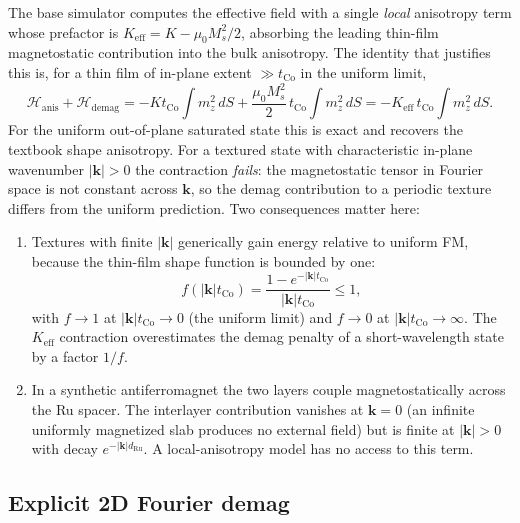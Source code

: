 \documentclass[11pt,a4paper]{article}
\newcommand{\mb}[1]{\mathbf{#1}}
\newcommand{\tCo}{t_{\text{Co}}}
\newcommand{\dRu}{d_{\text{Ru}}}
\newcommand{\Keff}{K_{\text{eff}}}
\newcommand{\Ms}{M_s}
\begin{document}
The base simulator computes the effective field with a single
\emph{local} anisotropy term whose prefactor is
$\Keff = K - \mu_0 \Ms^2 / 2$, absorbing the leading thin-film
magnetostatic contribution into the bulk anisotropy. The
identity that justifies this is, for a thin film of in-plane
extent $\gg \tCo$ in the uniform limit,
%
\begin{equation}\label{eq:keff_uniform}
\mathcal{H}_{\text{anis}} + \mathcal{H}_{\text{demag}}
    = -K \tCo \int m_z^2 \, dS
    + \frac{\mu_0 \Ms^2}{2} \, \tCo \int m_z^2 \, dS
    = -\Keff \, \tCo \int m_z^2 \, dS.
\end{equation}
%
For the uniform out-of-plane saturated state this is exact
and recovers the textbook shape anisotropy. For a textured
state with characteristic in-plane wavenumber $|\mb{k}| > 0$
the contraction \emph{fails}: the magnetostatic tensor in
Fourier space is not constant across $\mb{k}$, so the demag
contribution to a periodic texture differs from the uniform
prediction. Two consequences matter here:
%
\begin{enumerate}[nosep]
\item Textures with finite $|\mb{k}|$ generically gain energy
    relative to uniform FM, because the thin-film shape
    function is bounded by one:
    \begin{equation}\label{eq:shape_function}
    f(|\mb{k}| \tCo) = \frac{1 - e^{-|\mb{k}|\tCo}}
        {|\mb{k}|\tCo} \le 1,
    \end{equation}
    with $f \to 1$ at $|\mb{k}|\tCo \to 0$ (the uniform
    limit) and $f \to 0$ at $|\mb{k}|\tCo \to \infty$. The
    $\Keff$ contraction overestimates the demag penalty of a
    short-wavelength state by a factor $1/f$.
\item In a synthetic antiferromagnet the two layers couple
    magnetostatically across the Ru spacer. The interlayer
    contribution vanishes at $\mb{k} = 0$ (an infinite
    uniformly magnetized slab produces no external field) but
    is finite at $|\mb{k}| > 0$ with decay $e^{-|\mb{k}|\dRu}$.
    A local-anisotropy model has no access to this term.
\end{enumerate}

\subsection{Explicit 2D Fourier demag}
\end{document}
